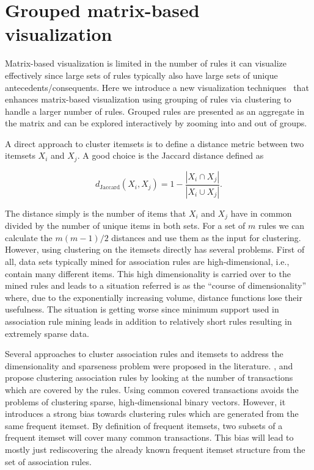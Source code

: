 \documentclass[nojss]{jss}
\begin{document}
\section{Grouped matrix-based visualization}
\label{sec:grouped}

Matrix-based visualization is limited in the number of
rules it can visualize effectively
since large sets of rules typically also have large sets of
unique antecedents/consequents. Here we introduce a new visualization
techniques~\citep{arulesViz:Hahsler2011}
that enhances matrix-based visualization using grouping of rules
via clustering to handle a larger number of rules. Grouped rules
are presented as an aggregate in the matrix and can be explored
interactively by zooming into and out of groups.

A direct approach to cluster itemsets is to define a distance metric
between two itemsets $X_i$ and $X_j$.
A good choice is the Jaccard distance defined as

$$d_\mathrm{Jaccard}(X_i, X_j) = 1 -
\frac{|X_i \cap X_j|}{|X_i \cup X_j|}.$$

The distance simply is the number of items that $X_i$ and $X_j$ have in common
divided by the number of unique items in both sets.  For a set of $m$ rules we
can calculate the $m(m-1)/2$ distances and use them as the input for
clustering.  However, using clustering on the itemsets directly has several
problems. First of all, data sets typically mined for association rules are
high-dimensional, i.e., contain many different items. This high dimensionality
is carried over to the mined rules and leads to a situation referred is as the
``course of dimensionality'' where, due to the exponentially increasing volume,
distance functions lose their usefulness. The situation is getting worse
since minimum support used in association rule mining leads in addition to
relatively short rules resulting in extremely sparse data.

Several approaches to cluster association rules and itemsets to address the
dimensionality and sparseness problem were proposed in the literature.
\cite{arulesViz:Toivonen:1995}, \cite{arulesViz:Gupta:1999} and
\cite{arulesViz:Berrado:2007} propose clustering association rules by looking at
the number of transactions which are covered by the rules.
Using common covered
transactions avoids the problems of clustering sparse, high-dimensional binary
vectors. However, it introduces a strong bias towards clustering rules which
are generated from the same frequent itemset.  By definition of frequent
itemsets, two subsets of a frequent itemset will cover many common
transactions.  This bias will lead to mostly just rediscovering the already
known frequent itemset structure from the set of association rules.
\end{document}
